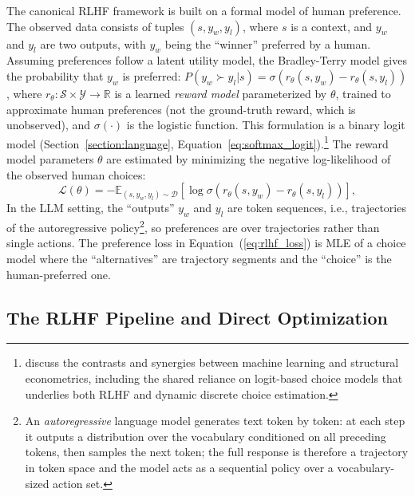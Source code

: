 The canonical RLHF framework is built on a formal model of human preference. The observed data consists of tuples $(s, y_w, y_l)$, where $s$ is a context, and $y_w$ and $y_l$ are two outputs, with $y_w$ being the ``winner'' preferred by a human. Assuming preferences follow a latent utility model, the Bradley-Terry model \citep{bradley1952rank} gives the probability that $y_w$ is preferred: $P(y_w \succ y_l | s) = \sigma(r_\theta(s, y_w) - r_\theta(s, y_l))$, where $r_\theta: \mathcal{S} \times \mathcal{Y} \to \mathbb{R}$ is a learned \textit{reward model} parameterized by $\theta$, trained to approximate human preferences (not the ground-truth reward, which is unobserved), and $\sigma(\cdot)$ is the logistic function. This formulation is a binary logit model (Section~\ref{section:language}, Equation~\ref{eq:softmax_logit}).\footnote{\citet{iskhakov2021} discuss the contrasts and synergies between machine learning and structural econometrics, including the shared reliance on logit-based choice models that underlies both RLHF and dynamic discrete choice estimation.} The reward model parameters $\theta$ are estimated by minimizing the negative log-likelihood of the observed human choices:
\begin{equation}
    \mathcal{L}(\theta) = -\mathbb{E}_{(s, y_w, y_l) \sim \mathcal{D}} \left[ \log \sigma \left( r_\theta(s, y_w) - r_\theta(s, y_l) \right) \right],
\label{eq:rlhf_loss}
\end{equation}
In the LLM setting, the ``outputs'' $y_w$ and $y_l$ are token sequences, i.e., trajectories of the autoregressive policy\footnote{An \emph{autoregressive} language model generates text token by token: at each step it outputs a distribution over the vocabulary conditioned on all preceding tokens, then samples the next token; the full response is therefore a trajectory in token space and the model acts as a sequential policy over a vocabulary-sized action set.}, so preferences are over trajectories rather than single actions. The preference loss in Equation~(\ref{eq:rlhf_loss}) is MLE of a choice model where the ``alternatives'' are trajectory segments and the ``choice'' is the human-preferred one.

\subsection{The RLHF Pipeline and Direct Optimization}

